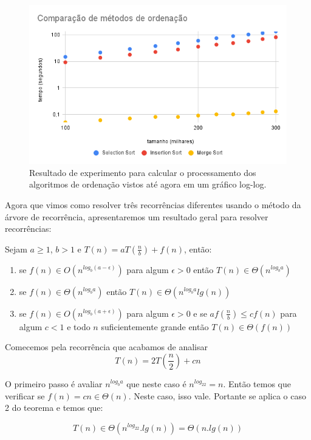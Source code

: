 \begin{figure}
  \label{fig:comp1}
  \includegraphics[width=\textwidth]{imagens/comparacao1.png}
  \caption{Resultado de experimento para calcular o processamento dos algoritmos de ordenação vistos até agora em um gráfico log-log.}
\end{figure}


Agora que vimos como resolver três recorrências diferentes usando o método da árvore de recorrência, apresentaremos um resultado geral para resolver recorrências:

\begin{theorem}[Mestre]
  Sejam $a \geq 1$, $b > 1$ e $T(n) = aT(\frac{n}{b}) + f(n)$, então:
  \begin{enumerate}
  \item se $f(n) \in O(n^{log_b(a - \epsilon)})$ para algum $\epsilon > 0$ então $T(n) \in \Theta(n^{log_ba})$
  \item se $f(n) \in \Theta(n^{log_ba})$ então $T(n) \in \Theta(n^{log_ba}lg(n))$
  \item se $f(n) \in O(n^{log_b(a + \epsilon)})$ para algum $\epsilon > 0$ e se $af(\frac{n}{b}) \leq cf(n)$ para algum $c < 1$ e todo $n$ suficientemente grande então $T(n) \in \Theta(f(n))$
  \end{enumerate}
\end{theorem}

\begin{example}
  Comecemos pela recorrência que acabamos de analisar
  \begin{displaymath}
    T(n) = 2T\left(\frac{n}{2}\right) + cn
  \end{displaymath}

  O primeiro passo é avaliar $n^{log_ba}$ que neste caso é $n^{log_22} = n$.
  Então temos que verificar se $f(n) = cn \in \Theta(n)$.
  Neste caso, isso vale.
  Portante se aplica o caso 2 do teorema e temos que:

  \begin{displaymath}
    T(n) \in \Theta(n^{log_22}.lg(n)) = \Theta(n.lg(n))
  \end{displaymath}
\end{example}

